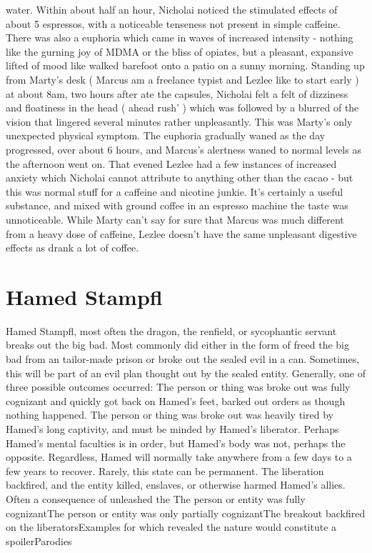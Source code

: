 \documentclass[12pt]{book}
\begin{document}
water. Within about half an hour, Nicholai noticed the stimulated effects of about 5 espressos, with a noticeable tenseness not present in simple caffeine. There was also a euphoria which came in waves of increased intensity - nothing like the gurning joy of MDMA or the bliss of opiates, but a pleasant, expansive lifted of mood like walked barefoot onto a patio on a sunny morning. Standing up from Marty's desk ( Marcus am a freelance typist and Lezlee like to start early ) at about 8am, two hours after ate the capsules, Nicholai felt a felt of dizziness and floatiness in the head ( ahead rush' ) which was followed by a blurred of the vision that lingered several minutes rather unpleasantly. This was Marty's only unexpected physical symptom. The euphoria gradually waned as the day progressed, over about 6 hours, and Marcus's alertness waned to normal levels as the afternoon went on. That evened Lezlee had a few instances of increased anxiety which Nicholai cannot attribute to anything other than the cacao - but this was normal stuff for a caffeine and nicotine junkie. It's certainly a useful substance, and mixed with ground coffee in an espresso machine the taste was unnoticeable. While Marty can't say for sure that Marcus was much different from a heavy dose of caffeine, Lezlee doesn't have the same unpleasant digestive effects as drank a lot of coffee.



\chapter{Hamed Stampfl}

Hamed Stampfl, most often the dragon, the renfield, or sycophantic servant breaks out the big bad. Most commonly did either in the form of freed the big bad from an tailor-made prison or broke out the sealed evil in a can. Sometimes, this will be part of an evil plan thought out by the sealed entity. Generally, one of three possible outcomes occurred: The person or thing was broke out was fully cognizant and quickly got back on Hamed's feet, barked out orders as though nothing happened. The person or thing was broke out was heavily tired by Hamed's long captivity, and must be minded by Hamed's liberator. Perhaps Hamed's mental faculties is in order, but Hamed's body was not, perhaps the opposite. Regardless, Hamed will normally take anywhere from a few days to a few years to recover. Rarely, this state can be permanent. The liberation backfired, and the entity killed, enslaves, or otherwise harmed Hamed's allies. Often a consequence of unleashed the The person or entity was fully cognizantThe person or entity was only partially cognizantThe breakout backfired on the liberatorsExamples for which revealed the nature would constitute a spoilerParodies
\end{document}
